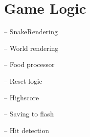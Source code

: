 \section{Game Logic}
-- SnakeRendering

-- World rendering

-- Food processor

-- Reset logic

-- Highscore

-- Saving to flash

-- Hit detection